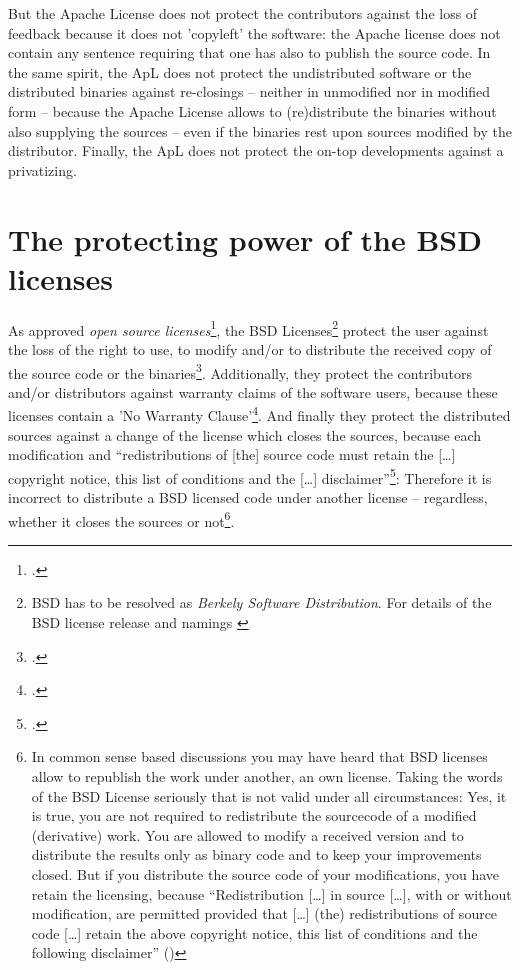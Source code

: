 But the Apache License does not protect the contributors against the loss of
feedback because it does not 'copyleft' the software: the Apache license does
not contain any sentence requiring that one has also to publish the source code.
In the same spirit, the ApL does not protect the undistributed software or the
distributed binaries against re-closings -- neither in unmodified nor in
modified form -- because the Apache License allows to (re)distribute the
binaries without also supplying the sources -- even if the binaries rest upon
sources modified by the distributor. Finally, the ApL does not protect the
on-top developments against a privatizing.


\section{The protecting power of the BSD licenses}
\label{sec:ProtectingPowerOfBsd}

As approved \emph{open source licenses}\footcite[cf.][\nopage wp]{OSI2012b}, the
BSD Licenses\footnote{BSD has to be resolved as \emph{Berkely Software
Distribution}. For details of the BSD license release and namings
\cite[cf.][\nopage wp\ editorial]{BsdLicense3Clause}} protect the user against
the loss of the right to use, to modify and/or to distribute the received copy
of the source code or the binaries\footcite[cf.][\nopage wp §1ff]{OSI2012a}.
Additionally, they protect the contributors and/or distributors against warranty
claims of the software users, because these licenses contain a 'No Warranty
Clause'\footcite[one for all version cf.][\nopage wp]{BsdLicense2Clause}. And
finally they protect the distributed sources against a change of the license
which closes the sources, because each modification and \enquote{redistributions
of [the] source code must retain the [\ldots] copyright notice, this list of
conditions and the [\ldots] disclaimer}\footcite[cf.][\nopage
wp]{BsdLicense2Clause}: Therefore it is incorrect to distribute a BSD licensed
code under another license -- regardless, whether it closes the sources or
not\footnote{In common sense based discussions you may have heard that BSD
licenses allow to republish the work under another, an own license. Taking the
words of the BSD License seriously that is not valid under all circumstances:
Yes, it is true, you are not required to redistribute the sourcecode of a
modified (derivative) work. You are allowed to modify a received version and to
distribute the results only as binary code and to keep your improvements closed.
But if you distribute the source code of your modifications, you have retain the
licensing, because \enquote{Redistribution [\ldots] in source [\ldots], with or
without modification, are permitted provided that [\ldots] (the) redistributions
of source code [\ldots] retain the above copyright notice, this list of
conditions and the following disclaimer} (\cite[cf.][\nopage
wp]{BsdLicense2Clause})}.

